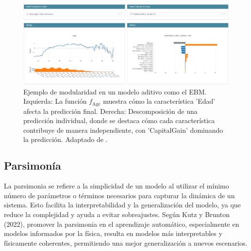 \begin{figure}[H]
    \centering
    \includegraphics[width=1\textwidth]{include/modularity.png}
    \caption{Ejemplo de modularidad en un modelo aditivo como el EBM. Izquierda: La función \( f_{\text{Age}} \) muestra cómo la característica 'Edad' afecta la predicción final. Derecha: Descomposición de una predicción individual, donde se destaca cómo cada característica contribuye de manera independiente, con 'CapitalGain' dominando la predicción. Adaptado de \cite{murdoch2019interpretable}.}
    \label{fig:modularidad_ebm}
\end{figure}

\subsection{Parsimonía}

La parsimonia se refiere a la simplicidad de un modelo al utilizar el mínimo número de parámetros o términos necesarios para capturar la dinámica de un sistema. Esto facilita la interpretabilidad y la generalización del modelo, ya que reduce la complejidad y ayuda a evitar sobreajustes. Según Kutz y Brunton (2022), promover la parsimonia en el aprendizaje automático, especialmente en modelos informados por la física, resulta en modelos más interpretables y físicamente coherentes, permitiendo una mejor generalización a nuevos escenarios.

